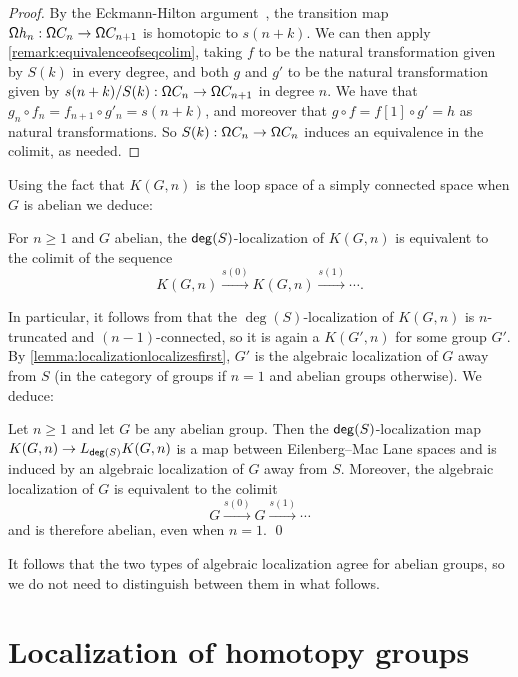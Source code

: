\begin{proof}
    By the Eckmann-Hilton argument~\cite[Theorem~2.1.6]{hottbook}, the transition map
    $\mathsf{\Omega} h_n : \mathsf{\Omega} C_n \to \mathsf{\Omega} C_{n+1}$ is homotopic to $s(n+k)$.
    We can then apply \cref{remark:equivalenceofseqcolim},
    taking $f$ to be the natural transformation given by
    $S(k)$ in every degree, and both $g$ and $g'$ to be the natural transformation given by
    $s(n + k)/S(k) : \mathsf{\Omega} C_n \to \mathsf{\Omega} C_{n+1}$ in degree $n$.
    We have that $g_n \circ f_n = f_{n+1} \circ g'_n = s(n + k)$, and moreover that
    $g \circ f = f[1] \circ g' = h$ as natural transformations.
    So $S(k) : \mathsf{\Omega} C_n \to \mathsf{\Omega} C_n$ induces an equivalence in the colimit,
    as needed.
\end{proof}

Using the fact that $K(G,n)$ is the loop space of a simply connected space
when $G$ is abelian we deduce:

\begin{cor}\label{corollary:localizationKgn}
    For $n \geq 1$ and $G$ abelian,
    the $\mathsf{deg}(S)$-localization of $K(G,n)$ is equivalent to the colimit of the sequence
    \[
      K(G,n) \xrightarrow{s(0)} K(G,n) \xrightarrow{s(1)} \cdots .  \tag*{\qed}
    \]
\end{cor}

In particular, it follows from \cite{DoornRijkeSojakova} that the
$\deg(S)$-localization of $K(G,n)$ is $n$-truncated and $(n-1)$-connected,
so it is again a $K(G',n)$ for some group $G'$.
By \cref{lemma:localizationlocalizesfirst}, $G'$ is the algebraic localization of $G$
away from $S$ (in the category of groups if $n = 1$ and abelian groups otherwise).
We deduce:

\begin{thm}\label{theorem:localizationKgn}
    Let $n\geq 1$ and let $G$ be any abelian group.
    Then the $\mathsf{deg}(S)$-localization map $K(G,n) \to L_{\mathsf{deg}(S)} K(G,n)$ is a map between Eilenberg--Mac Lane spaces and
    is induced by an algebraic localization of $G$ away from $S$.
    Moreover, the algebraic localization of $G$ is equivalent to the colimit
    \[
      G \xrightarrow{s(0)} G \xrightarrow{s(1)} \cdots
    \]
    and is therefore abelian, even when $n = 1$.  \qed
\end{thm}

It follows that the two types of algebraic localization agree for abelian groups,
so we do not need to distinguish between them in what follows.

\section{Localization of homotopy groups}\label{ss:localization-of-homotopy-groups}

